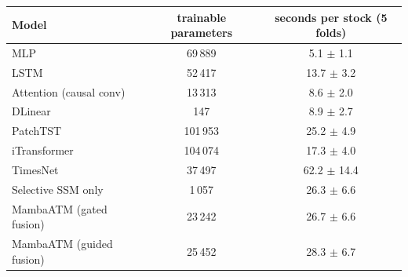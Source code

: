 {\footnotesize
\setlength{\tabcolsep}{3pt}
\begin{tabular}{lcc}
\toprule
\textbf{Model} & \textbf{trainable parameters} & \textbf{seconds per stock (5 folds)} \\
\midrule
MLP & 69\,889 & 5.1 $\pm$ 1.1 \\
LSTM & 52\,417 & 13.7 $\pm$ 3.2 \\
Attention (causal conv) & 13\,313 & 8.6 $\pm$ 2.0 \\
DLinear & 147 & 8.9 $\pm$ 2.7 \\
PatchTST & 101\,953 & 25.2 $\pm$ 4.9 \\
iTransformer & 104\,074 & 17.3 $\pm$ 4.0 \\
TimesNet & 37\,497 & 62.2 $\pm$ 14.4 \\
Selective SSM only & 1\,057 & 26.3 $\pm$ 6.6 \\
MambaATM (gated fusion) & 23\,242 & 26.7 $\pm$ 6.6 \\
MambaATM (guided fusion) & 25\,452 & 28.3 $\pm$ 6.7 \\
\bottomrule
\end{tabular}
}
